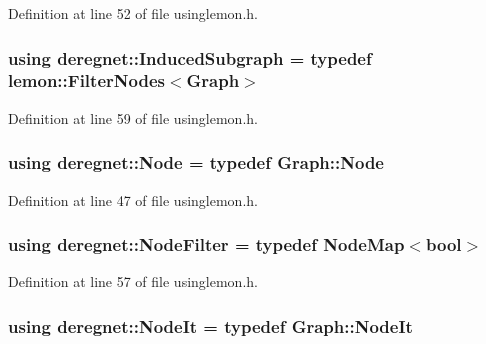 Definition at line 52 of file usinglemon.\+h.

\subsubsection[{\texorpdfstring{Induced\+Subgraph}{InducedSubgraph}}]{\setlength{\rightskip}{0pt plus 5cm}using {\bf deregnet\+::\+Induced\+Subgraph} = typedef lemon\+::\+Filter\+Nodes$<${\bf Graph}$>$}\hypertarget{namespacederegnet_ad1e0ad2af7b91e41fc1d8a15a1da5041}{}\label{namespacederegnet_ad1e0ad2af7b91e41fc1d8a15a1da5041}


Definition at line 59 of file usinglemon.\+h.

\subsubsection[{\texorpdfstring{Node}{Node}}]{\setlength{\rightskip}{0pt plus 5cm}using {\bf deregnet\+::\+Node} = typedef Graph\+::\+Node}\hypertarget{namespacederegnet_a744bad34f2de9856d36715a445f027f3}{}\label{namespacederegnet_a744bad34f2de9856d36715a445f027f3}


Definition at line 47 of file usinglemon.\+h.

\subsubsection[{\texorpdfstring{Node\+Filter}{NodeFilter}}]{\setlength{\rightskip}{0pt plus 5cm}using {\bf deregnet\+::\+Node\+Filter} = typedef {\bf Node\+Map}$<$bool$>$}\hypertarget{namespacederegnet_a50db1f8fc7c6a954d825d9e1ed9ad302}{}\label{namespacederegnet_a50db1f8fc7c6a954d825d9e1ed9ad302}


Definition at line 57 of file usinglemon.\+h.

\subsubsection[{\texorpdfstring{Node\+It}{NodeIt}}]{\setlength{\rightskip}{0pt plus 5cm}using {\bf deregnet\+::\+Node\+It} = typedef Graph\+::\+Node\+It}\hypertarget{namespacederegnet_ac34314e1b5f456fc6d1bb9d96316de4a}{}\label{namespacederegnet_ac34314e1b5f456fc6d1bb9d96316de4a}


